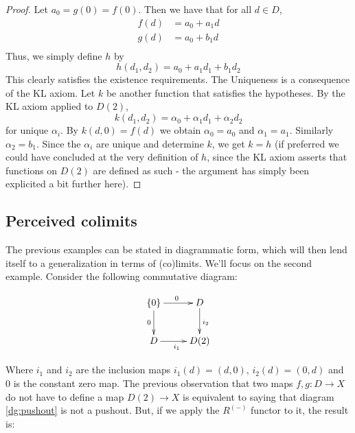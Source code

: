 \documentclass[11pt]{article}
\theoremstyle{definition}
\newcommand{\farg}{-} %
\numberwithin{equation}{section}
\begin{document}
\begin{proof}
  Let \( a_0 = g(0)=f(0) \). Then we have that for all \( d\in D \),
  \begin{align*}
    f(d) &= a_0 + a_1d \\
    g(d) &= a_0 + b_1d \\
  \end{align*}
  Thus, we simply define \( h \) by
  \begin{equation*}
    h(d_1,d_2) = a_0 + a_1d_1 + b_1d_2
  \end{equation*}
  This clearly satisfies the existence requirements. The Uniqueness is a consequence of the KL axiom. Let \( k \) be another function that satisfies the hypotheses. By the KL axiom applied to \( D(2) \),
  \begin{equation*}
    k(d_1,d_2) = \alpha_0 + \alpha_1d_1 + \alpha_2d_2
  \end{equation*}
  for unique \( \alpha_i \). By \( k(d,0)=f(d) \) we obtain \( \alpha_0=a_0 \) and \( \alpha_1 = a_1 \). Similarly \( \alpha_2=b_1 \). Since the \( \alpha_i \) are unique and determine \( k \), we get \( k=h \) (if preferred we could have concluded at the very definition of \( h \), since the KL axiom asserts that functions on \( D(2) \) are defined as such - the argument has simply been explicited a bit further here).

\end{proof}

\subsection{Perceived colimits}

The previous examples can be stated in diagrammatic form, which will then lend itself to a generalization in terms of (co)limits. We'll focus on the second example. Consider the following commutative diagram:

\begin{equation}
  \xymatrix{
    {\{0\}} \ar[d]_0 \ar[r]^0   & D \ar[d]^{i_2} \\
    D \ar[r]_{i_1}              & D(2)
  }
  \label{dg:pushout}
\end{equation}

Where \( i_1 \) and \( i_2 \) are the inclusion maps \( i_1(d)=(d,0),\, i_2(d)=(0,d) \) and \( 0 \) is the constant zero map. The previous observation that two maps \( f,g:D\to X \) do not have to define a map \( D(2)\to X \) is equivalent to saying that diagram \ref{dg:pushout} is not a pushout. But, if we apply the \( R^{(\farg)} \) functor to it, the result is:
\end{document}
